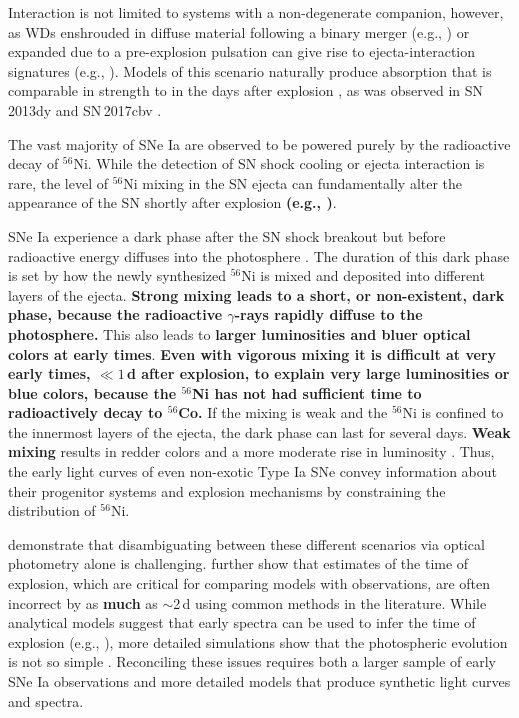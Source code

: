 \documentclass[twocolumn]{aastex61}
\begin{document}
Interaction is not limited to systems with a non-degenerate companion,
however, as WDs enshrouded in diffuse material following a binary merger
(e.g., \citealt{2015MNRAS.447.2803L}) or expanded due to a pre-explosion
pulsation can give rise to ejecta-interaction signatures (e.g.,
\citealt{2014MNRAS.441..532D}). Models of this scenario naturally produce
 absorption that is comparable in strength to  in the
days after explosion \citep{2014MNRAS.441..532D}, as was observed in
SN\,2013dy \citep{2013ApJ...778L..15Z} and SN\,2017cbv
\citep{2017ApJ...845L..11H}.

The vast majority of SNe Ia are observed to be powered purely by the
radioactive decay of $^{56}$Ni. While the detection of SN shock cooling or
ejecta interaction is rare, the level of $^{56}$Ni mixing in the SN ejecta can
fundamentally alter the appearance of the SN shortly after explosion
\textbf{(e.g.,
\citealt{2014MNRAS.441..532D,2016ApJ...826...96P,2017MNRAS.472.2787N})}. 

SNe Ia experience a dark phase after the SN shock breakout but before
radioactive energy diffuses into the photosphere \citep{2014ApJ...784...85P}.
The duration of this dark phase is set by how the newly synthesized $^{56}$Ni
is mixed and deposited into different layers of the ejecta. \textbf{Strong
mixing leads to a short, or non-existent, dark phase, because the radioactive
$\gamma$-rays rapidly diffuse to the photosphere.} This also leads to
\textbf{larger luminosities and bluer optical colors at early times}.
\textbf{Even with vigorous mixing it is difficult at very early times, $\ll
1$\,d after explosion, to explain very large luminosities or blue colors,
because the $^{56}$Ni has not had sufficient time to radioactively decay to
$^{56}$Co.} If the mixing is weak and the $^{56}$Ni is confined to the
innermost layers of the ejecta, the dark phase can last for several days.
\textbf{Weak mixing} results in redder colors and a more moderate rise in
luminosity \citep{2014MNRAS.441..532D,2016ApJ...826...96P}. Thus, the early
light curves of even non-exotic Type Ia SNe convey information about their
progenitor systems and explosion mechanisms by constraining the distribution
of $^{56}$Ni.

\citet{2017MNRAS.472.2787N} demonstrate that disambiguating between these
different scenarios via optical photometry alone is challenging.
\citeauthor{2017MNRAS.472.2787N} further show that estimates of the time of
explosion, which are critical for comparing models with observations, are
often incorrect by as \textbf{much} as $\sim$2\,d using common methods in the
literature. While analytical models suggest that early spectra can be used to
infer the time of explosion (e.g., \citealt{2014ApJ...784...85P}), more
detailed simulations show that the photospheric evolution is not so simple
\citep{2016ApJ...826...96P}. Reconciling these issues requires both a larger
sample of early SNe Ia observations and more detailed models that produce
synthetic light curves and spectra.
\end{document}
